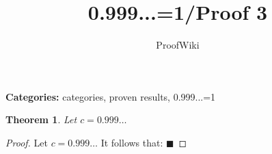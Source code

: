 \documentclass{article}
\title{0.999...=1/Proof 3}
\author{ProofWiki}
\date{}
\newtheorem{theorem}{Theorem}
\begin{document}
\maketitle

\noindent\textbf{Categories:} categories, proven results, 0.999...=1

\begin{theorem}
Let  $c = 0.999 \ldots$
\end{theorem}

\begin{proof}
Let  $c = 0.999 \ldots$ It follows that: $\blacksquare$
\end{proof}
\end{document}
